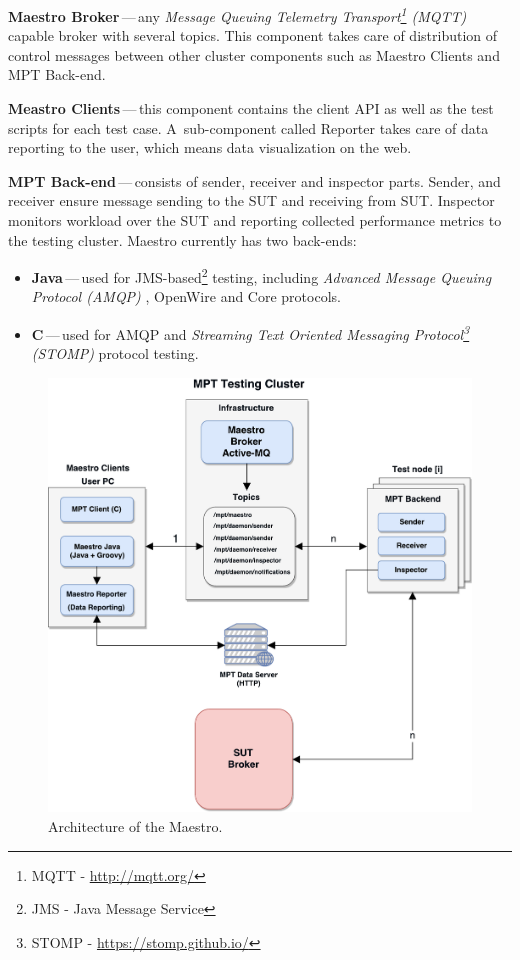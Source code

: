 \begin{description}
	\setlength\itemsep{0em}
	\item \textbf{Maestro Broker}\,---\,any \emph{Message Queuing Telemetry Transport\footnote{MQTT - \url{http://mqtt.org/}} (MQTT)} capable broker with several topics. This component takes care of distribution of control messages between other cluster components such as Maestro Clients and MPT Back-end.
	\item \textbf{Meastro Clients}\,---\,this component contains the client API as well as the test scripts for each test case. A~sub-component called Reporter takes care of data reporting to the user, which means data visualization on the web.
	\item \textbf{MPT Back-end}\,---\,consists of sender, receiver and inspector parts. Sender, and receiver ensure message sending to the SUT and receiving from SUT. Inspector monitors workload over the SUT and reporting collected performance metrics to the testing cluster. Maestro currently has two back-ends:
	\begin{itemize}
		\item \textbf{Java}\,---\,used for JMS-based\footnote{JMS - Java Message Service} testing, including \emph{Advanced Message Queuing Protocol (AMQP)} \cite{OASIS:AMQP}, OpenWire and Core protocols.
		\item \textbf{C}\,---\,used for AMQP and \emph{Streaming Text Oriented Messaging Protocol\footnote{STOMP - \url{https://stomp.github.io/}} (STOMP)} protocol testing.
	\end{itemize}
\end{description}

\begin{figure}[H]
  \centering
  \includegraphics[width=15cm]{obrazky-figures/msg_perf_tool.pdf}
  \caption{Architecture of the Maestro.}
  \label{fig:msg_perf_tool}
\end{figure}


